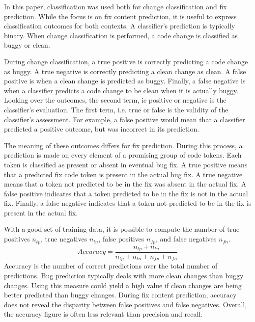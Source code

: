 \documentclass[10pt, conference, letterpaper, compsocconf]{IEEEtran}
\begin{document}
In this paper, classification was used both for change classification and fix prediction. While the focus is on fix content prediction, 
it is useful to express classification outcomes for both contexts. A classifier's prediction is typically binary. When change classification is performed, a code change is classified as buggy or clean.

During change classification, a true positive is correctly predicting a code change as buggy. A true negative is correctly predicting a clean change as clean. 
A false positive is when a clean change is predicted as buggy. Finally, a false negative is when a classifier predicts a code change to be clean when it is actually buggy. Looking over the outcomes, the second term, ie positive or negative is the classifier's evaluation. The first term, i.e. true or false is the validity of the classifier's assessment. For example, a false positive would mean that a classifier predicted a positive outcome, but was incorrect in its prediction.

The meaning of these outcomes differs for fix prediction. During this process, a prediction is made on every element of a promising group of code tokens. Each token is classified as present or absent in eventual bug fix. A true positive means that a predicted fix code token is present in the actual bug fix. A true negative means that a token not predicted to be in the fix was absent in the actual fix. 
A false positive indicates that a token predicted to be in the fix is not in the actual fix. Finally, a false negative indicates that a token not predicted to be in the fix is present in the actual fix.

%

\par With a good set of training data, it is possible to compute the number of true positives $n_{tp}$, true negatives $n_{tn}$, false positives $n_{fp}$, and false negatives $n_{fn}$.
 $$Accuracy = \dfrac{n_{tp} + n_{tn}}{n_{tp} + n_{tn} + n_{fp} + n_{fn}}$$
    Accuracy is the number of correct predictions over
 the total number of predictions. Bug prediction typically deals with more clean
 changes than buggy changes. Using this measure could yield a high
 value if clean changes are being better predicted than buggy
 changes. During fix content prediction, accuracy does not reveal the disparity between false positives and false negatives. Overall, the accuracy figure is often less relevant than precision and recall. 
 
\end{document}
